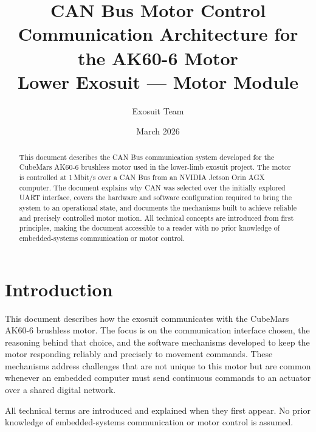\documentclass[12pt,a4paper]{article}
\title{%
  \textbf{CAN Bus Motor Control}\\[0.5em]
  \large Communication Architecture for the AK60-6 Motor\\
  \normalsize Lower Exosuit --- Motor Module
}
\author{Exosuit Team}
\date{March 2026}
\begin{document}
\maketitle

\begin{abstract}
This document describes the CAN Bus communication system developed for the
CubeMars AK60-6 brushless motor used in the lower-limb exosuit project.
The motor is controlled at 1\,Mbit/s over a CAN Bus from an NVIDIA Jetson
Orin AGX computer.  The document explains why CAN was selected over the
initially explored UART interface, covers the hardware and software
configuration required to bring the system to an operational state, and
documents the mechanisms built to achieve reliable and precisely controlled
motor motion.  All technical concepts are introduced from first principles,
making the document accessible to a reader with no prior knowledge of
embedded-systems communication or motor control.
\end{abstract}

\newpage
\tableofcontents
\newpage

\section{Introduction}

This document describes how the exosuit communicates with the CubeMars
AK60-6 brushless motor.  The focus is on the communication interface
chosen, the reasoning behind that choice, and the software mechanisms
developed to keep the motor responding reliably and precisely to movement
commands.  These mechanisms address challenges that are not unique to this
motor but are common whenever an embedded computer must send continuous
commands to an actuator over a shared digital network.

All technical terms are introduced and explained when they first appear.
No prior knowledge of embedded-systems communication or motor control is
assumed.
\end{document}
